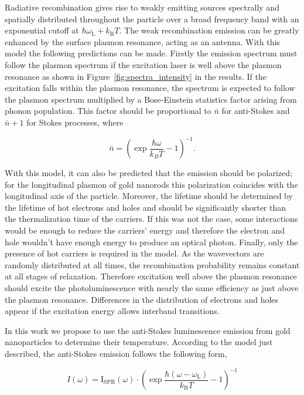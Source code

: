 Radiative recombination gives rise to weakly emitting sources spectrally and
spatially distributed throughout the particle over a broad frequency band with
an exponential cutoff at $\hbar\omega_\textrm{L}+k_\textrm{B}T$. The weak
recombination emission can be greatly enhanced by the surface plasmon resonance,
acting as an antenna. With this model the following predictions can be made.
Firstly the emission spectrum must follow the plasmon spectrum if the excitation
laser is well above the plasmon resonance as shown in \mbox{Figure
\ref{fig:spectra_intensity}} in the results. If the excitation falls within the
plasmon resonance, the spectrum is expected to follow the plasmon spectrum
multiplied by a Bose-Einstein statistics factor arising from phonon population.
This factor should be proportional to $\bar{n}$ for anti-Stokes and $\bar{n}+1$
for Stokes processes, where

\begin{equation}
	\bar{n}=\left(\exp\frac{\hbar\omega}{k_BT}-1\right)^{-1}.
\end{equation}

With this model, it can also be predicted that the emission should be polarized;
for the longitudinal plasmon of gold nanorods this polarization coincides with
the longitudinal axis of the particle\cite{He2015}. Moreover, the lifetime
should be determined by the lifetime of hot electrons and holes and should be
significantly shorter than the thermalization time of the carriers. If this was
not the case, some interactions would be enough to reduce the carriers' energy
and therefore the electron and hole wouldn't have enough energy to produce an
optical photon. Finally, only the presence of hot carriers is required in the
model. As the wavevectors are randomly distributed at all times, the
recombination probability remains constant at all stages of relaxation.
Therefore excitation well above the plasmon resonance should excite the
photoluminescence with nearly the same efficiency as just above the plasmon
resonance\cite{Cheng2015}. Differences in the distribution of electrons and
holes appear if the excitation energy allows interband
transitions\cite{Sundararaman2014,Brown2016}. 

In this work we propose to use the anti-Stokes luminescence emission from gold
nanoparticles to determine their temperature. According to the model just
described, the anti-Stokes emission follows the following form,

\begin{equation}\label{eqn:fitting}
	I(\omega) =
	\textrm{I}_{\textrm{SPR}}(\omega)\cdot\left(\exp\frac{\hbar(\omega-\omega_\textrm{L})}{k_\textrm{B}T}-1\right)^{-1}
\end{equation}

